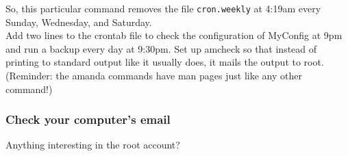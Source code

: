 \documentclass{article}
\begin{document}
So, this particular command removes the file \verb|cron.weekly| at 4:19am every Sunday, Wednesday, and Saturday. \\

Add two lines to the crontab file to check the configuration of MyConfig at 9pm and run a backup every day at 9:30pm. Set up amcheck so that instead of printing to standard output like it usually does, it mails the output to root. (Reminder: the amanda commands have man pages just like any other command!)


\subsubsection*{Check your computer's email}

\indent\indent Anything interesting in the root account?
\end{document}
